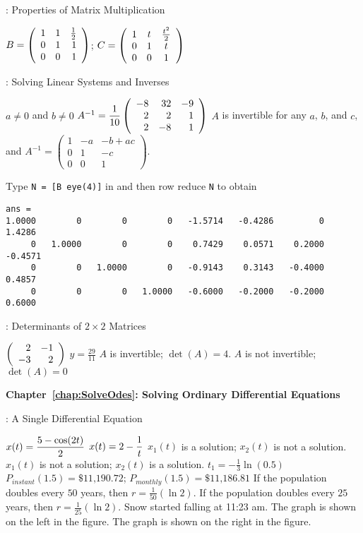 : Properties of Matrix Multiplication

$B = \left(\begin{array}{rrr} 1 & 1 & \frac{1}{2} \\ 0 & 1 & 1 \\ 0 & 0 & 1\end{array}\right)$; 
$C = \left(\begin{array}{ccc} 1 & t & \frac{t^2}{2} \\ 0 & 1 & t \\ 0 & 0 & 1\end{array}\right)$


: Solving Linear Systems and Inverses


 \ans $a \neq 0$ and $b \neq 0$
 \ans
$A^{-1} = \displaystyle\frac{1}{10}\left(\begin{array}{rrr} -8 & 32 & -9 \\ 2 & 2 & 1 \\ 2 & -8 & 1\end{array}\right)$
\ans  $A$ is invertible for any $a$, $b$, and $c$, and
$A^{-1} = \left(\begin{array}{rrc} 1 & -a & -b + ac \\ 0 & 1 & -c 
\\ 0 & 0 & 1 \end{array}\right)$.

Type {\tt N = [B eye(4)]} in \Matlab and then row reduce {\tt N} to obtain
\begin{verbatim}
ans =
1.0000        0        0        0   -1.5714   -0.4286         0    1.4286
     0   1.0000        0        0    0.7429    0.0571    0.2000   -0.4571
     0        0   1.0000        0   -0.9143    0.3143   -0.4000    0.4857
     0        0        0   1.0000   -0.6000   -0.2000   -0.2000    0.6000
\end{verbatim}


: Determinants of $2\times 2$ Matrices

  $\left(\begin{array}{rr} 2 & -1\\ -3 &2\end{array}\right)$
 \ans  $y=\frac{29}{11}$
 \ans $A$ is invertible; $\det(A) = 4$.
 \ans $A$ is not invertible; $\det(A) = 0$


\vspace{0.08in}
{\bf Chapter~\ref{chap:SolveOdes}: Solving Ordinary Differential Equations}


: A Single Differential Equation

\ans $\displaystyle x(t) = \frac{5 - \cos(2t)}{2}$
 $\displaystyle x(t) = 2 - \frac{1}{t}$
\ans $x_1(t)$ is a solution; $x_2(t)$ is not a solution.
\ans $x_1(t)$ is not a solution; $x_2(t)$ is a solution.
\ans $t_1 = -\frac{1}{3} \ln(0.5)$
\ans $P_{instant}(1.5) = \mbox{\$}11\mbox{,}190.72$;
$P_{monthly}(1.5) = \mbox{\$}11\mbox{,}186.81$
\ans If the population doubles every $50$ years, then
$r = \frac{1}{50}(\ln 2)$.  If the population doubles every $25$
years, then $r = \frac{1}{25}(\ln 2)$.
 \ans Snow started falling at 11:23 am.
  The graph is shown on the left in the figure.
  The graph is shown on the right in the figure.
\begin{figure}[ht]
                       \centerline{%
                       }
\end{figure}

